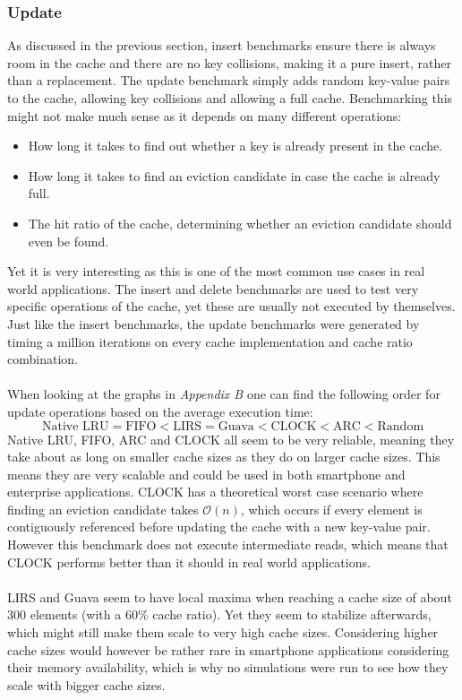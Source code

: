 \documentclass[pdftex,a4paper,12pt,twoside]{report}
\begin{document}
\subsubsection{Update}
As discussed in the previous section, insert benchmarks ensure there is always room in the cache and there are no key collisions, making it a pure insert, rather than a replacement. The update benchmark simply adds random key-value pairs to the cache, allowing key collisions and allowing a full cache. Benchmarking this might not make much sense as it depends on many different operations:
\begin{itemize}
\item How long it takes to find out whether a key is already present in the cache.
\item How long it takes to find an eviction candidate in case the cache is already full.
\item The hit ratio of the cache, determining whether an eviction candidate should even be found.
\end{itemize}
Yet it is very interesting as this is one of the most common use cases in real world applications. The insert and delete benchmarks are used to test very specific operations of the cache, yet these are usually not executed by themselves.
Just like the insert benchmarks, the update benchmarks were generated by timing a million iterations on every cache implementation and cache ratio combination.
\\\\
When looking at the graphs in \emph{Appendix B} one can find the following order for update operations based on the average execution time:
\[
\text{Native LRU} = \text{FIFO} < \text{LIRS} = \text{Guava} < \text{CLOCK} < \text{ARC} < \text{Random}
\]
Native LRU, FIFO, ARC and CLOCK all seem to be very reliable, meaning they take about as long on smaller cache sizes as they do on larger cache sizes. This means they are very scalable and could be used in both smartphone and enterprise applications. CLOCK has a theoretical worst case scenario where finding an eviction candidate takes $\mathcal{O}(n)$, which occurs if every element is contiguously referenced before updating the cache with a new key-value pair. However this benchmark does not execute intermediate reads, which means that CLOCK performs better than it should in real world applications.
\\\\
LIRS and Guava seem to have local maxima when reaching a cache size of about 300 elements (with a 60\% cache ratio). Yet they seem to stabilize afterwards, which might still make them scale to very high cache sizes. Considering higher cache sizes would however be rather rare in smartphone applications considering their memory availability, which is why no simulations were run to see how they scale with bigger cache sizes.
\end{document}
